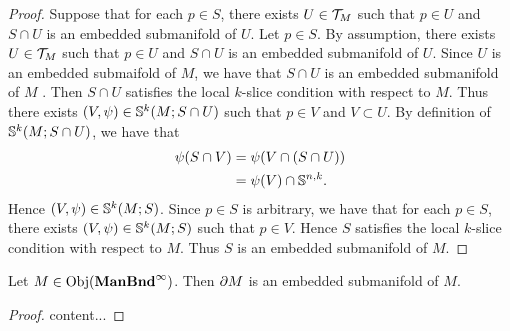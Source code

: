 \documentclass{book}
\begin{document}
	\begin{proof}
		Suppose that for each $p \in S$, there exists $U \in \MT_M$ such that $p \in U$ and $S \cap U$ is an embedded submanifold of $U$. Let $p \in S$. By assumption, there exists $U \in \MT_M$ such that $p \in U$ and $S \cap U$ is an embedded submanifold of $U$. Since $U$ is an embedded submaifold of $M$, we have that $S \cap U$ is an embedded submanifold of $M$ . Then $S \cap U$ satisfies the local $k$-slice condition with respect to $M$. Thus there exists $(V, \psi) \in \S^k(M; S \cap U)$ such that $p \in V$ and $V \subset U$. By definition of $\S^k(M; S \cap U)$, we have that 
		\begin{align*}
			\psi(S \cap V)
			& = \psi(V \cap (S \cap U)) \\
			& = \psi(V) \cap \S^{n,k}.
		\end{align*}
		Hence $(V, \psi) \in \S^k(M; S)$. Since $p \in S$ is arbitrary, we have that for each $p \in S$, there exists $(V, \psi) \in \S^k(M; S)$ such that $p \in V$. Hence $S$ satisfies the local $k$-slice condition with respect to $M$. Thus $S$ is an embedded submanifold of $M$. 
	\end{proof}


	\begin{ex} 
		 Let $M \in \Obj(\ManBndinf)$. Then $\p M$ is an embedded submanifold of $M$.  
	\end{ex}	
	
	\begin{proof}
		content... 
	\end{proof}
	
\end{document}
